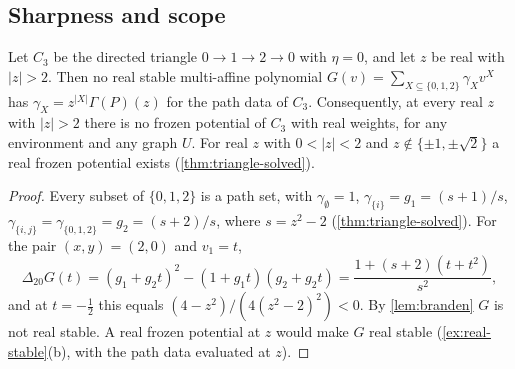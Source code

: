 \subsection{Sharpness and scope}

\begin{proposition}\label{prop:triangle-band}
Let $C_3$ be the directed triangle $0\to1\to2\to0$ with $\eta=0$, and let $z$ be real with $|z|>2$. Then no real stable multi-affine polynomial $G(v)=\sum_{X\subseteq\{0,1,2\}}\gamma_Xv^X$ has $\gamma_X=z^{|X|}\Gamma(P)(z)$ for the path data of $C_3$. Consequently, at every real $z$ with $|z|>2$ there is no frozen potential of $C_3$ with real weights, for any environment and any graph $U$. For real $z$ with $0<|z|<2$ and $z\notin\{\pm1,\pm\sqrt2\}$ a real frozen potential exists \textup{(}\cref{thm:triangle-solved}\textup{)}.
\end{proposition}
\begin{proof}
Every subset of $\{0,1,2\}$ is a path set, with $\gamma_\emptyset=1$, $\gamma_{\{i\}}=g_1=(s+1)/s$, $\gamma_{\{i,j\}}=\gamma_{\{0,1,2\}}=g_2=(s+2)/s$, where $s=z^2-2$ (\cref{thm:triangle-solved}). For the pair $(x,y)=(2,0)$ and $v_1=t$,
\[
\Delta_{20}G(t)=(g_1+g_2t)^2-(1+g_1t)(g_2+g_2t)=\frac{1+(s+2)(t+t^2)}{s^2},
\]
and at $t=-\frac12$ this equals $(4-z^2)/(4(z^2-2)^2)<0$. By \cref{lem:branden} $G$ is not real stable. A real frozen potential at $z$ would make $G$ real stable (\cref{ex:real-stable}(b), with the path data evaluated at $z$).
\end{proof}


